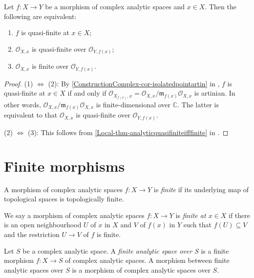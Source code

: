\begin{proposition}\label{prop-quasifinitechar}
    Let $f:X\rightarrow Y$ be a morphism of complex analytic spaces and $x\in X$. Then the following are equivalent:
    \begin{enumerate}
        \item $f$ is quasi-finite at $x\in X$;
        \item $\mathcal{O}_{X,x}$ is quasi-finite over $\mathcal{O}_{Y,f(x)}$;
        \item $\mathcal{O}_{X,x}$ is finite over $\mathcal{O}_{Y,f(x)}$.
    \end{enumerate}
\end{proposition}
\begin{proof}
    (1) $\Leftrightarrow$ (2): By \cref{ConstructionComplex-cor-isolatedpointartin} in , $f$ is quasi-finite at $x\in X$ if and only if $\mathcal{O}_{X_{f(x)},x}=\mathcal{O}_{X,x}/\mathfrak{m}_{f(x)}\mathcal{O}_{X,x}$ is artinian. In other words, $\mathcal{O}_{X,x}/\mathfrak{m}_{f(x)}\mathcal{O}_{X,x}$ is finite-dimensional over $\mathbb{C}$. The latter is equivalent to that $\mathcal{O}_{X,x}$ is quasi-finite over $\mathcal{O}_{Y,f(x)}$. 

    (2) $\Leftrightarrow$ (3): This follows from \cref{Local-thm-analyticquasifiniteifffinite} in .
\end{proof}


\section{Finite morphisms}


\begin{definition}
    A morphism of complex analytic spaces $f:X\rightarrow Y$ is \emph{finite} if its underlying map of topological spaces is topologically finite.

    We say a morphism of complex analytic spaces $f:X\rightarrow Y$ is \emph{finite at $x\in X$} if there is an open neighbourhood $U$ of $x$ in $X$ and $V$ of $f(x)$ in $Y$ such that $f(U)\subseteq V$ and the restriction $U\rightarrow V$ of $f$ is finite.

    Let $S$ be a complex analytic space. A \emph{finite analytic space over $S$} is a finite morphism $f:X\rightarrow S$ of complex analytic spaces. A morphism between finite analytic spaces over $S$ is a morphism of complex analytic spaces over $S$.
\end{definition}

